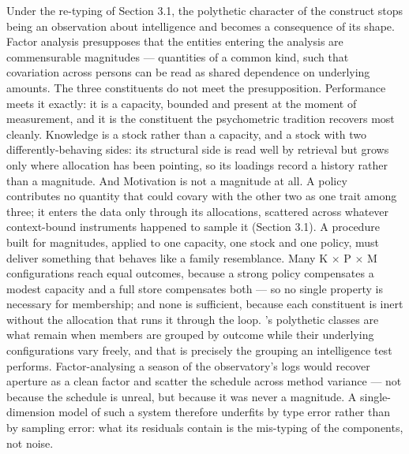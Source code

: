 \documentclass[12pt,a4paper]{article}
\begin{document}
Under the re-typing of Section 3.1, the polythetic character of the construct stops being an observation about intelligence and becomes a consequence of its shape. Factor analysis presupposes that the entities entering the analysis are commensurable magnitudes ---\hspace{0pt} quantities of a common kind, such that covariation across persons can be read as shared dependence on underlying amounts. The three constituents do not meet the presupposition. Performance meets it exactly: it is a capacity, bounded and present at the moment of measurement, and it is the constituent the psychometric tradition recovers most cleanly. Knowledge is a stock rather than a capacity, and a stock with two differently-behaving sides: its structural side is read well by retrieval but grows only where allocation has been pointing, so its loadings record a history rather than a magnitude. And Motivation is not a magnitude at all. A policy contributes no quantity that could covary with the other two as one trait among three; it enters the data only through its allocations, scattered across whatever context-bound instruments happened to sample it (Section 3.1). A procedure built for magnitudes, applied to one capacity, one stock and one policy, must deliver something that behaves like a family resemblance. Many K $\times$ P $\times$ M configurations reach equal outcomes, because a strong policy compensates a modest capacity and a full store compensates both ---\hspace{0pt} so no single property is necessary for membership; and none is sufficient, because each constituent is inert without the allocation that runs it through the loop. \citeauthor{Beckner1959}'s \citeyearpar{Beckner1959} polythetic classes are what remain when members are grouped by outcome while their underlying configurations vary freely, and that is precisely the grouping an intelligence test performs. Factor-analysing a season of the observatory's logs would recover aperture as a clean factor and scatter the schedule across method variance ---\hspace{0pt} not because the schedule is unreal, but because it was never a magnitude. A single-dimension model of such a system therefore underfits by type error rather than by sampling error: what its residuals contain is the mis-typing of the components, not noise.
\end{document}
